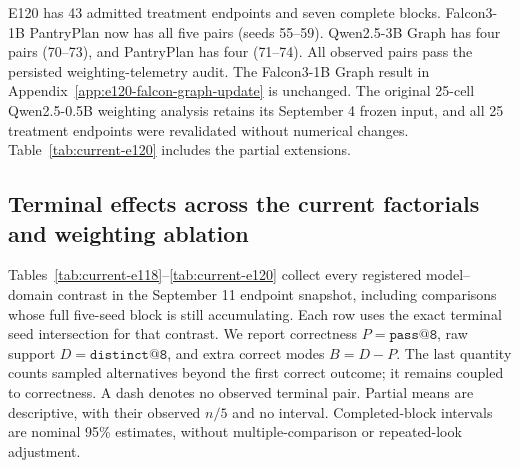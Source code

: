 \documentclass{article}
\newcommand{\1}{\mathbf 1}
\theoremstyle{remark}
\theoremstyle{definition}
\theoremstyle{plain}
\begin{document}
E120 has 43 admitted treatment endpoints and seven complete blocks.
Falcon3-1B PantryPlan now has all five pairs (seeds 55--59).
Qwen2.5-3B Graph has four pairs (70--73), and PantryPlan has four (71--74).
All observed pairs pass the persisted weighting-telemetry audit. The
Falcon3-1B Graph result in Appendix~\ref{app:e120-falcon-graph-update} is
unchanged.
The original 25-cell Qwen2.5-0.5B weighting analysis retains its September 4
frozen input, and all 25 treatment endpoints were revalidated without
numerical changes. Table~\ref{tab:current-e120} includes the partial extensions.


\subsection{Terminal effects across the current factorials and weighting ablation}
\label{app:current-campaign-results}

Tables~\ref{tab:current-e118}--\ref{tab:current-e120} collect every registered
model--domain contrast in the September 11 endpoint snapshot, including
comparisons whose full five-seed block is still accumulating. Each row uses
the exact terminal seed intersection for that contrast. We report correctness
$P=\texttt{pass@8}$, raw support $D=\texttt{distinct@8}$, and extra correct
modes $B=D-P$. The last quantity counts sampled alternatives beyond the first
correct outcome; it remains coupled to correctness. A dash denotes no observed
terminal pair. Partial means are descriptive, with their observed $n/5$ and
no interval. Completed-block intervals are nominal 95\% estimates, without
multiple-comparison or repeated-look adjustment.

\begin{table}[H]
  \centering
  \caption{\textbf{ReplayMaxRL effects across model scales at pass 8.}
  All effects are ReplayMaxRL minus MaxRL on the displayed paired seeds.
  Brackets give paired Student-$t$ intervals for $\Delta B$ in complete blocks.
  The machine-readable report also retains both arm means, all per-seed
  effects, and intervals for $P$ and $D$.}
  \label{tab:current-e118}
  \scriptsize
  \setlength{\tabcolsep}{3pt}
\end{table}
\end{document}
